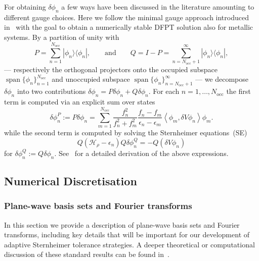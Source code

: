 \documentclass[hidelinks,onefignum,onetabnum]{siamart250211}
\newcommand{\spann}{\operatorname{span}}
\newcommand{\Nocc}{N_{\mathrm{occ}}}
\newcommand{\braket}[2]{\left\langle #1, #2 \right\rangle}
\newcommand{\Hrho}{\mathcal{H}_\rho}
\begin{document}
For obtaining $\delta \phi_n$ a few ways have been discussed in the literature
amounting to different gauge choices. Here we follow the
minimal gauge approach introduced in~\cite{cances2023numerical}
with the goal to obtain a numerically stable DFPT solution
also for metallic systems.
By a partition of unity with
\begin{equation}
    P = \sum_{n=1}^{\Nocc} | \phi_n \rangle \langle \phi_n |, \qquad\text{and}\qquad  Q = I - P = \sum_{n=\Nocc+1}^{\infty} | \phi_n \rangle \langle \phi_n |,
\end{equation}
--- respectively the orthogonal projectors onto the occupied subspace $\spann \{ \phi_n \}_{n=1}^{\Nocc}$
and unoccupied subspace $\spann \{ \phi_n \}_{n=\Nocc+1}^{\infty}$ ---
we decompose $\delta \phi_n$ into two contributions
$\delta \phi_n = P \delta \phi_n + Q \delta \phi_n$.
For each $n = 1,\ldots,\Nocc$ the first term is computed via an explicit sum over states
\begin{equation}\label{eq:delta_phi_P}
    \delta \phi_n^P := P \delta \phi_n = \sum_{m=1}^{\Nocc} \frac{f_n^2}{f_n^2 + f_m^2} \frac{f_n - f_m}{\epsilon_n - \epsilon_m} \braket{\phi_m}{\delta V \phi_n} \phi_m.
\end{equation}
%
while the second term is computed by solving the Sternheimer equations~(SE)
\begin{equation}
    Q \left(\Hrho - \epsilon_n \right) Q \delta \phi_n^Q = -Q \left(\delta V \phi_n\right)
    \label{eq:sternheimer_equation}
\end{equation}
for $\delta \phi_n^Q := Q \delta \phi_n$.
See~\cite{cances2023numerical}
for a detailed derivation of the above expressions.

%
%
%
%
%
%
%
%

\subsection{Numerical Discretisation}

\subsubsection{Plane-wave basis sets and Fourier transforms}\label{sec:plane_wave_basis}
In this section we provide a
description of plane-wave basis sets and Fourier transforms,
including key details that will be important for our development of
adaptive Sternheimer tolerance strategies.
A deeper theoretical or computational discussion of these standard results
can be found in~\cite{lin2019KSDFT,cances2022planewave}.
\end{document}
